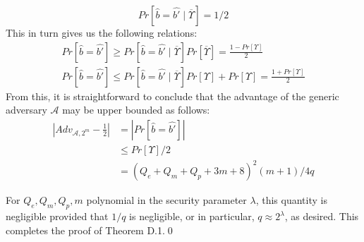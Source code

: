 \begin{equation}
 Pr[\hat{b}=\hat{b'}\mid\overline{\Upsilon}]=1/2\nonumber
\end{equation}
\noindent This in turn gives us the following relations:
\begin{eqnarray}
 Pr[\hat{b}=\hat{b'}]\geq Pr[\hat{b}=\hat{b'}\mid\overline{\Upsilon}]Pr[\overline{\Upsilon}]=\frac{1-Pr[\Upsilon]}{2}\nonumber\\
 Pr[\hat{b}=\hat{b'}]\leq Pr[\hat{b}=\hat{b'}\mid\overline{\Upsilon}]Pr[\Upsilon] + Pr[{\Upsilon}] = \frac{1+Pr[\Upsilon]}{2}\nonumber
\end{eqnarray}
\noindent From this, it is straightforward to conclude that the advantage of the generic adversary $\mathcal{A}$ may be upper bounded as follows:
\begin{equation}
\begin{split}
 |Adv_{\mathcal{A},2^m}-\frac{1}{2}| &= |Pr[\hat{b}=\hat{b'}]|\\
 &\leq {Pr[\Upsilon]}/{2}\\
 &= \left(Q_e+Q_m+Q_p+3m+8\right)^2\left(m+1\right)/4q\nonumber
\end{split} 
\end{equation}

\noindent For $Q_e,Q_m,Q_p,m$ polynomial in the security parameter $\lambda$, this quantity is negligible provided that $1/q$ is negligible, or in particular, $q\approx 2^{\lambda}$, as desired. This completes the proof of Theorem D.1.\hfill\qed 